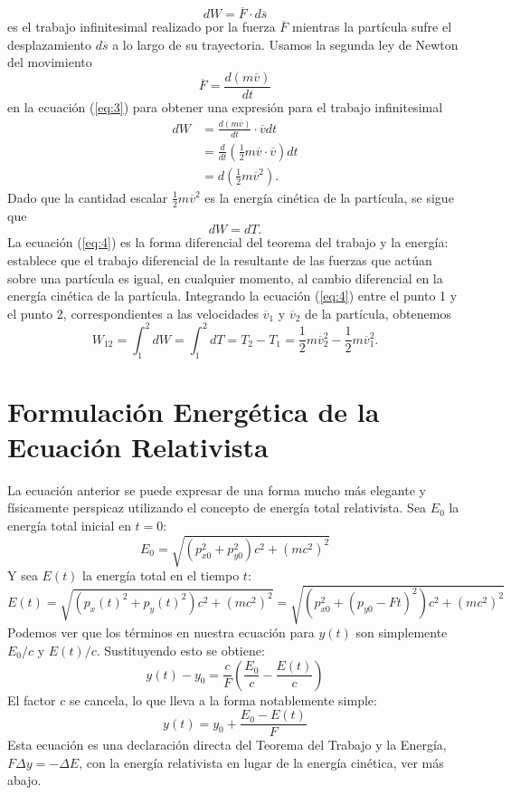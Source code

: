 \documentclass[11pt,a4paper]{book}
\begin{document}
\begin{equation}
dW = \overline{F} \cdot d\overline{s} \label{eq:3}
\end{equation}
es el trabajo infinitesimal realizado por la fuerza $\overline{F}$ mientras la partícula sufre el desplazamiento $d\overline{s}$ a lo largo de su trayectoria. Usamos la segunda ley de Newton del movimiento
\begin{equation}
\overline{F} = \frac{d(m\overline{v})}{dt}
\end{equation}
en la ecuación (\ref{eq:3}) para obtener una expresión para el trabajo infinitesimal
\begin{align*}
dW &= \frac{d(m\overline{v})}{dt} \cdot \overline{v}dt \\
&= \frac{d}{dt}\left(\frac{1}{2}m\overline{v}\cdot\overline{v}\right)dt \\
&= d\left(\frac{1}{2}m\overline{v}^{2}\right).
\end{align*}
Dado que la cantidad escalar $\frac{1}{2}m\overline{v}^{2}$ es la energía cinética de la partícula, se sigue que
\begin{equation}
dW = dT. \label{eq:4}
\end{equation}
La ecuación (\ref{eq:4}) es la forma diferencial del teorema del trabajo y la energía: establece que el trabajo diferencial de la resultante de las fuerzas que actúan sobre una partícula es igual, en cualquier momento, al cambio diferencial en la energía cinética de la partícula. Integrando la ecuación (\ref{eq:4}) entre el punto 1 y el punto 2, correspondientes a las velocidades $\overline{v}_1$ y $\overline{v}_2$ de la partícula, obtenemos
\begin{equation}
W_{12} = \int_{1}^{2} dW = \int_{1}^{2} dT = T_2 - T_1 = \frac{1}{2}m\overline{v}_{2}^{2} - \frac{1}{2}m\overline{v}_{1}^{2}. \label{eq:5}
\end{equation}



\section{Formulación Energética de la Ecuación Relativista}
La ecuación anterior se puede expresar de una forma mucho más elegante y físicamente perspicaz utilizando el concepto de energía total relativista.
Sea $E_0$ la energía total inicial en $t=0$:
\[ E_0 = \sqrt{(p_{x0}^2 + p_{y0}^2)c^2 + (mc^2)^2} \]
Y sea $E(t)$ la energía total en el tiempo $t$:
\[ E(t) = \sqrt{(p_x(t)^2 + p_y(t)^2)c^2 + (mc^2)^2} = \sqrt{(p_{x0}^2 + (p_{y0}-Ft)^2)c^2 + (mc^2)^2} \]
Podemos ver que los términos en nuestra ecuación para $y(t)$ son simplemente $E_0/c$ y $E(t)/c$. Sustituyendo esto se obtiene:
\[ y(t) - y_0 = \frac{c}{F} \left( \frac{E_0}{c} - \frac{E(t)}{c} \right) \]
El factor $c$ se cancela, lo que lleva a la forma notablemente simple:
\[ \boxed{y(t) = y_0 + \frac{E_0 - E(t)}{F}} \]
Esta ecuación es una declaración directa del Teorema del Trabajo y la Energía, $F \Delta y = -\Delta E$, con la energía relativista en lugar de la energía cinética, ver más abajo.
\end{document}
